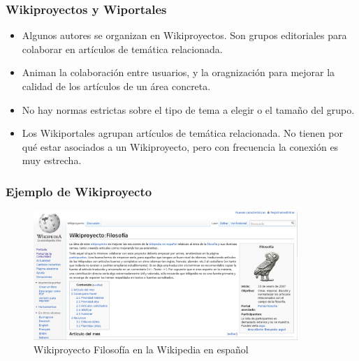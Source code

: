 \begin{frame}
\frametitle{Wikiproyectos y Wiportales}

  \begin{itemize}

    \item Algunos autores se organizan en Wikiproyectos. Son grupos 
editoriales para colaborar en artículos de temática relacionada. 

    \item Animan la colaboración entre usuarios, y la oragnización para
mejorar la calidad de los artículos de un área concreta.

    \item No hay normas estrictas sobre el tipo de tema a elegir o el tamaño
del grupo.

    \item Los Wikiportales agrupan artículos de temática relacionada. No tienen
por qué estar asociados a un Wikiproyecto, pero con frecuencia la conexión es
muy estrecha.

   \end{itemize}

\end{frame}


\begin{frame}
\frametitle{Ejemplo de Wikiproyecto}

\begin{figure}[htp]
\centering
\includegraphics[width=10cm]{figs/wikiproyecto-filosofia.png}
\caption{Wikiproyecto Filosofía en la Wikipedia en español}
\end{figure}

\end{frame}


